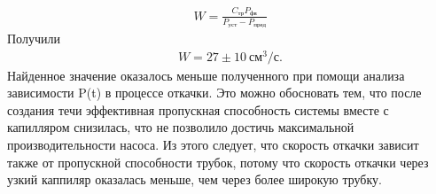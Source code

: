 \begin{align*}
            W = \frac{C_\text{тр} P_\text{фв}}{P_\text{уст} - P_\text{пред}}
 \end{align*}
 Получили 
 \begin{align*}
 W = 27 \pm 10 \ \text{см}^3 / \text{с}.
 \end{align*}
 Найденное значение оказалось меньше полученного при помощи анализа зависимости P(t) в процессе откачки. Это можно обосновать тем, что после создания течи эффективная пропускная способность системы вместе с капилляром снизилась, что не позволило достичь максимальной производительности насоса. Из этого следует, что скорость откачки зависит также от пропускной способности трубок, потому что скорость откачки через узкий каппиляр оказалась меньше, чем через более широкую трубку.